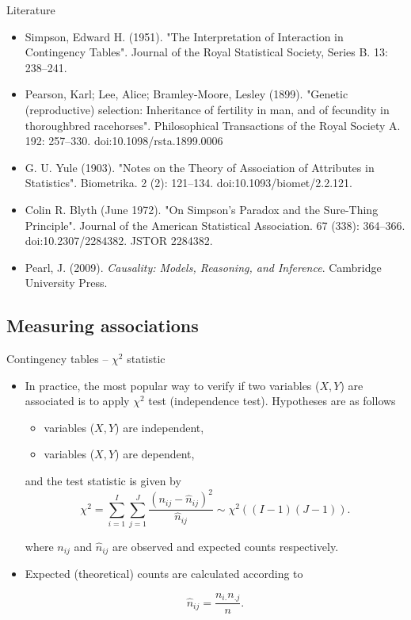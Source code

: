 \documentclass[10pt,ignorenonframetext,aspectratio=169]{beamer}
\begin{document}
\begin{frame}{Literature}
    \begin{itemize}
    \justifying
        \item Simpson, Edward H. (1951). "The Interpretation of Interaction in Contingency Tables". Journal of the Royal Statistical Society, Series B. 13: 238–241.
        \item Pearson, Karl; Lee, Alice; Bramley-Moore, Lesley (1899). "Genetic (reproductive) selection: Inheritance of fertility in man, and of fecundity in thoroughbred racehorses". Philosophical Transactions of the Royal Society A. 192: 257–330. doi:10.1098/rsta.1899.0006
        \item G. U. Yule (1903). "Notes on the Theory of Association of Attributes in Statistics". Biometrika. 2 (2): 121–134. doi:10.1093/biomet/2.2.121.
        \item Colin R. Blyth (June 1972). "On Simpson's Paradox and the Sure-Thing Principle". Journal of the American Statistical Association. 67 (338): 364–366. doi:10.2307/2284382. JSTOR 2284382.
        \item Pearl, J. (2009). \textit{Causality: Models, Reasoning, and Inference}. Cambridge University Press.
    \end{itemize}
\end{frame}



\subsection{Measuring associations}
\begin{frame}{Contingency tables -- $\chi^2$ statistic}

\begin{itemize}
    \item In practice, the most popular way to verify if two variables ($X,Y$) are associated is to apply $\chi^2$ test (independence test). Hypotheses are as follows
    
    \begin{itemize}
        \item[H0:] variables ($X,Y$) are independent,
        \item[H1:] variables ($X,Y$) are dependent,
    \end{itemize}
    and the test statistic is given by
\begin{equation}
    \chi^{2}=\sum_{i=1}^{I} \sum_{j=1}^{J} \frac{\left(n_{i j}-\hat{n}_{i j}\right)^{2}}{\hat{n}_{i j}} \sim \chi^2((I-1)(J-1)).
\end{equation}

where $n_{ij}$ and $\hat{n}_{i j}$ are observed and expected counts respectively.
\item Expected (theoretical) counts are calculated according to

\begin{equation}
    \hat{n}_{i j}=\frac{n_{i .} n_{ . j}}{n}.
\end{equation}


\end{itemize}


\end{frame}
\end{document}
